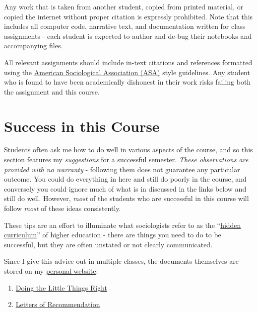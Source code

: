 \documentclass[
]{book}
\providecommand{\tightlist}{%
  \setlength{\itemsep}{0pt}\setlength{\parskip}{0pt}}
\begin{document}
Any work that is taken from another student, copied from printed material, or copied the internet without proper citation is expressly prohibited. Note that this includes all computer code, narrative text, and documentation written for class assignments - each student is expected to author and de-bug their notebooks and accompanying files.

All relevant assignments should include in-text citations and references formatted using the \href{https://owl.english.purdue.edu/owl/resource/583/1/}{American Sociological Association (ASA)} style guidelines. Any student who is found to have been academically dishonest in their work risks failing both the assignment and this course.

\hypertarget{success-in-this-course}{%
\chapter{Success in this Course}\label{success-in-this-course}}

Students often ask me how to do well in various aspects of the course, and so this section features my \emph{suggestions} for a successful semester. \emph{These observations are provided with no warranty} - following them does not guarantee any particular outcome. You could do everything in here and still do poorly in the course, and conversely you could ignore much of what is in discussed in the links below and still do well. However, \emph{most} of the students who are successful in this course will follow \emph{most} of these ideas consistently.

These tips are an effort to illuminate what sociologists refer to as the ``\href{https://books.google.com/books?hl=en\&lr=\&id=5r-TAgAAQBAJ\&oi=fnd\&pg=PP1\&dq=hidden+curriculum\#v=onepage\&q=hidden\%20curriculum\&f=false}{hidden curriculum}'' of higher education - there are things you need to do to be successful, but they are often unstated or not clearly communicated.

Since I give this advice out in multiple classes, the documents themselves are stored on my \href{https://chris-prener.github.io}{personal website}:

\begin{enumerate}
\def\labelenumi{\arabic{enumi}.}
\tightlist
\item
  \href{https://chris-prener.github.io/resources/students/little-things/}{Doing the Little Things Right}
\item
  \href{https://chris-prener.github.io/resources/students/letters/}{Letters of Recommendation}
\end{enumerate}
\end{document}
